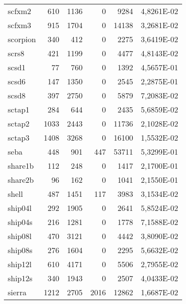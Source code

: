 {\begin{longtable}{>{\ttfamily}lrrrrc}
scfxm2       		& 610       & 1136      & 0           & 9284     & \num{4,8261E-02} \\
scfxm3       		& 915       & 1704      & 0           & 14138    & \num{3,2681E-02} \\
scorpion     		& 340       & 412       & 0           & 2275     & \num{3,6419E-02} \\
scrs8        		& 421       & 1199      & 0           & 4477     & \num{4,8143E-02} \\
scsd1        		& 77        & 760       & 0           & 1392     & \num{4,5657E-01} \\
scsd6        		& 147       & 1350      & 0           & 2545     & \num{2,2875E-01} \\
scsd8        		& 397       & 2750      & 0           & 5879     & \num{7,2083E-02} \\
sctap1       		& 284       & 644       & 0           & 2435     & \num{5,6859E-02} \\
sctap2       		& 1033      & 2443      & 0           & 11736    & \num{2,1028E-02} \\
sctap3       		& 1408      & 3268      & 0           & 16100    & \num{1,5532E-02} \\
seba         		& 448       & 901       & 447         & 53711    & \num{5,3299E-01} \\
share1b      		& 112       & 248       & 0           & 1417     & \num{2,1700E-01} \\
share2b      		& 96        & 162       & 0           & 1041     & \num{2,1550E-01} \\
shell        		& 487       & 1451      & 117         & 3983     & \num{3,1534E-02} \\
ship04l      		& 292       & 1905      & 0           & 2641     & \num{5,8524E-02} \\
ship04s      		& 216       & 1281      & 0           & 1778     & \num{7,1588E-02} \\
ship08l      		& 470       & 3121      & 0           & 4442     & \num{3,8090E-02} \\
ship08s      		& 276       & 1604      & 0           & 2295     & \num{5,6632E-02} \\
ship12l      		& 610       & 4171      & 0           & 5506     & \num{2,7955E-02} \\
ship12s      		& 340       & 1943      & 0           & 2507     & \num{4,0433E-02} \\
sierra       		& 1212      & 2705      & 2016        & 12862    & \num{1,6687E-02} \\

\end{longtable}}
